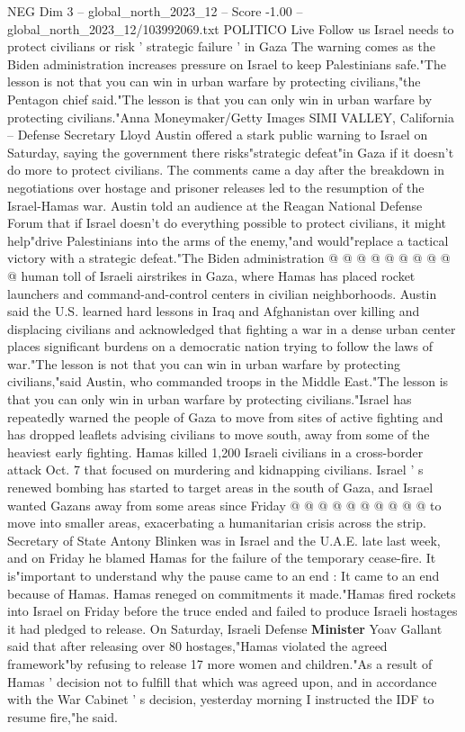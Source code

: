 \begin{textsample}{NEG Dim 3 – global\_north\_2023\_12 – Score -1.00 – global\_north\_2023\_12/103992069.txt}  \label{ex:f3_neg_239}
POLITICO Live Follow us Israel needs to protect civilians or risk ' strategic failure ' in Gaza The warning comes as the Biden administration increases pressure on Israel to keep Palestinians safe."The lesson is not that you can win in urban warfare by protecting civilians,"the Pentagon chief said."The lesson is that you can only win in urban warfare by protecting civilians."Anna Moneymaker/Getty Images SIMI VALLEY, California -- Defense Secretary Lloyd Austin offered a stark public warning to Israel on Saturday, saying the government there risks"strategic defeat"in Gaza if it doesn't do more to protect civilians.
The comments came a day after the breakdown in negotiations over hostage and prisoner releases led to the resumption of the Israel-Hamas war.
Austin told an audience at the Reagan National Defense Forum that if Israel doesn't do everything possible to protect civilians, it might help"drive Palestinians into the arms of the enemy,"and would"replace a tactical victory with a strategic defeat."The Biden administration @ @ @ @ @ @ @ @ @ @ human toll of Israeli airstrikes in Gaza, where Hamas has placed rocket launchers and command-and-control centers in civilian neighborhoods.
Austin said the U.S. learned hard lessons in Iraq and Afghanistan over killing and displacing civilians and acknowledged that fighting a war in a dense urban center places significant burdens on a democratic nation trying to follow the laws of war."The lesson is not that you can win in urban warfare by protecting civilians,"said Austin, who commanded troops in the Middle East."The lesson is that you can only win in urban warfare by protecting civilians."Israel has repeatedly warned the people of Gaza to move from sites of active fighting and has dropped leaflets advising civilians to move south, away from some of the heaviest early fighting.
Hamas killed 1,200 Israeli civilians in a cross-border attack Oct. 7 that focused on murdering and kidnapping civilians.
Israel ' s renewed bombing has started to target areas in the south of Gaza, and Israel wanted Gazans away from some areas since Friday @ @ @ @ @ @ @ @ @ @ to move into smaller areas, exacerbating a humanitarian crisis across the strip.
Secretary of State Antony Blinken was in Israel and the U.A.E. late last week, and on Friday he blamed Hamas for the failure of the temporary cease-fire.
It is"important to understand why the pause came to an end : It came to an end because of Hamas.
Hamas reneged on commitments it made."Hamas fired rockets into Israel on Friday before the truce ended and failed to produce Israeli hostages it had pledged to release.
On Saturday, Israeli Defense \textbf{Minister} Yoav Gallant said that after releasing over 80 hostages,"Hamas violated the agreed framework"by refusing to release 17 more women and children."As a result of Hamas ' decision not to fulfill that which was agreed upon, and in accordance with the War Cabinet ' s decision, yesterday morning I instructed the IDF to resume fire,"he said.

\end{textsample}
